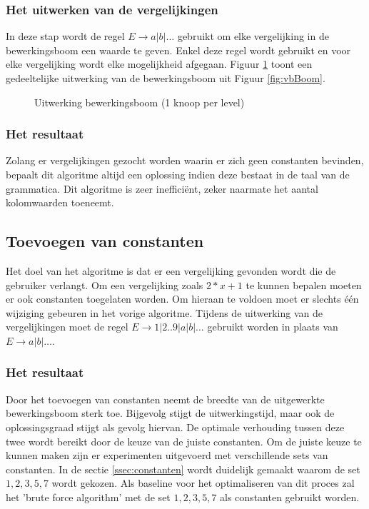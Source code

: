 \documentclass[Main.tex]{subfiles}
\begin{document}
\subsubsection*{Het uitwerken van de vergelijkingen}
In deze stap wordt de regel $E \rightarrow a | b | \dotsc$ gebruikt om elke vergelijking in de bewerkingsboom een waarde te geven. Enkel deze regel wordt gebruikt en voor elke vergelijking wordt elke mogelijkheid afgegaan. Figuur \ref{fig:uitwerkingsboom} toont een gedeeltelijke uitwerking van de bewerkingsboom uit Figuur \ref{fig:vbBoom}.
\begin{figure}[!htb]
\centering
{}
\caption{Uitwerking bewerkingsboom (1 knoop per level)} \label{fig:uitwerkingsboom}
\end{figure}

\subsubsection*{Het resultaat}
Zolang er vergelijkingen gezocht worden waarin er zich geen constanten bevinden, bepaalt dit algoritme altijd een oplossing indien deze bestaat in de taal van de grammatica. Dit algoritme is zeer ineffici\"ent, zeker naarmate het aantal kolomwaarden toeneemt. 

\subsection{Toevoegen van constanten}
Het doel van het algoritme is dat er een vergelijking gevonden wordt die de gebruiker verlangt. Om een vergelijking zoals $2 \ast x+1$ te kunnen bepalen moeten er ook constanten toegelaten worden. Om hieraan te voldoen moet er slechts \'e\'en wijziging gebeuren in het vorige algoritme. Tijdens de uitwerking van de vergelijkingen moet de regel $E \rightarrow 1 | 2 .. 9 | a | b | \dotsc$ gebruikt worden in plaats van $E \rightarrow a | b | \dotsc$.

\subsubsection*{Het resultaat}
Door het toevoegen van constanten neemt de breedte van de uitgewerkte bewerkingsboom sterk toe. Bijgevolg stijgt de uitwerkingstijd, maar ook de oplossingsgraad stijgt als gevolg hiervan. De optimale verhouding tussen deze twee wordt bereikt door de keuze van de juiste constanten. Om de juiste keuze te kunnen maken zijn er experimenten uitgevoerd met verschillende sets van constanten. In de sectie  \ref{ssec:constanten} wordt duidelijk gemaakt waarom de set ${1, 2, 3, 5, 7}$ wordt gekozen. Als baseline voor het optimaliseren van dit proces zal het 'brute force algorithm' met de set ${1, 2, 3, 5, 7}$ als constanten gebruikt worden.
\end{document}
